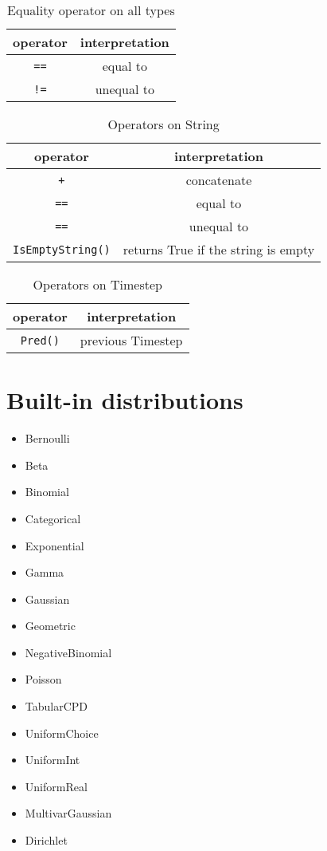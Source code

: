 \documentclass[12pt]{article}
\begin{document}
\begin{table}[h]
\centering
\caption{Equality operator on all types}
\begin{tabular}{ c c }
\toprule 
operator & interpretation \\
\midrule
{\tt ==} & equal to \\ 
{\tt !=} & unequal to \\ 
\bottomrule
\end{tabular}
\end{table}

\begin{table}[h]
\centering
\caption{Operators on String}
\begin{tabular}{ c c }
\toprule 
operator & interpretation \\
\midrule
{\tt +} & concatenate \\ 
{\tt ==} & equal to \\
{\tt ==} & unequal to \\ 
\verb|IsEmptyString()| & returns True if the string is empty\\
\bottomrule
\end{tabular}
\end{table}

\begin{table}[h]
\centering
\caption{Operators on Timestep}
\begin{tabular}{ c c }
\toprule 
operator & interpretation \\
\midrule
\verb|Pred()| & previous Timestep\\
\bottomrule
\end{tabular}
\end{table}



\section{Built-in distributions}
\begin{itemize}
\item Bernoulli
\item Beta
\item Binomial
\item Categorical
\item Exponential
\item Gamma
\item Gaussian
\item Geometric
\item NegativeBinomial
\item Poisson
\item TabularCPD
\item UniformChoice
\item UniformInt
\item UniformReal
\item MultivarGaussian
\item Dirichlet
\end{itemize}
\end{document}
